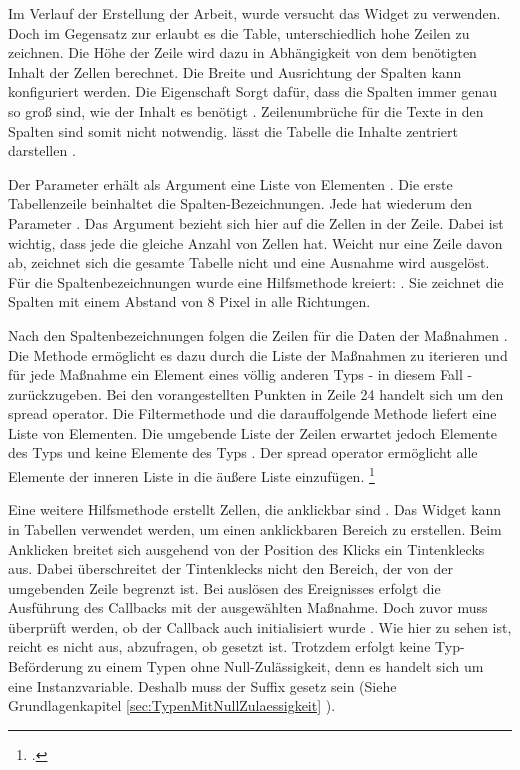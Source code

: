 Im Verlauf der Erstellung der Arbeit, wurde versucht das Widget  zu verwenden.
Doch im Gegensatz zur  erlaubt es die Table, unterschiedlich hohe Zeilen zu zeichnen.
Die Höhe der Zeile wird dazu in Abhängigkeit von dem benötigten Inhalt der Zellen berechnet.
Die Breite und Ausrichtung der Spalten kann konfiguriert werden.
Die Eigenschaft  Sorgt dafür, dass die Spalten immer genau so groß sind, wie der Inhalt es benötigt .  Zeilenumbrüche für die Texte in den Spalten sind somit nicht notwendig. lässt die  Tabelle die Inhalte zentriert darstellen .

Der Parameter  erhält als Argument eine Liste von  Elementen .
Die erste Tabellenzeile  beinhaltet die Spalten-Bezeichnungen.
Jede  hat wiederum den Parameter .
Das Argument bezieht sich hier auf die Zellen in der Zeile.
Dabei ist wichtig, dass jede  die gleiche Anzahl von Zellen hat.
Weicht nur eine Zeile davon ab, zeichnet sich die gesamte Tabelle nicht und eine Ausnahme wird ausgelöst.
Für die Spaltenbezeichnungen wurde eine Hilfsmethode kreiert:  .
Sie zeichnet die Spalten mit einem Abstand von 8 Pixel in alle Richtungen.

Nach den Spaltenbezeichnungen folgen die Zeilen für die Daten der Maßnahmen .
Die Methode   ermöglicht es dazu durch die Liste der Maßnahmen zu iterieren und für jede Maßnahme ein Element eines völlig anderen Typs - in diesem Fall  - zurückzugeben.
Bei den vorangestellten Punkten  in Zeile 24 handelt sich um den spread operator. Die Filtermethode  und die darauffolgende Methode  liefert eine Liste von  Elementen. Die umgebende Liste der Zeilen   erwartet jedoch Elemente des Typs  und keine Elemente des Typs . Der spread operator ermöglicht alle Elemente der inneren Liste in die äußere Liste einzufügen. \footcite[Vgl.][]{SpreadOperator}

Eine weitere Hilfsmethode  erstellt Zellen, die anklickbar sind .
Das Widget   kann in Tabellen verwendet werden, um einen anklickbaren Bereich zu erstellen.
Beim  Anklicken breitet sich ausgehend von der Position des Klicks ein Tintenklecks  aus.
Dabei überschreitet der Tintenklecks nicht den Bereich, der von der umgebenden Zeile begrenzt ist.
Bei auslösen des Ereignisses  erfolgt die Ausführung des Callbacks   mit der ausgewählten Maßnahme.
Doch zuvor muss überprüft werden, ob der Callback auch initialisiert wurde .
Wie hier zu sehen ist, reicht es nicht aus, abzufragen, ob   gesetzt ist.
Trotzdem erfolgt keine Typ-Beförderung zu einem Typen ohne Null-Zulässigkeit, denn es handelt sich um eine Instanzvariable.
Deshalb muss der Suffix \IC{!} gesetz sein (Siehe Grundlagenkapitel \ref{sec:TypenMitNullZulaessigkeit} ).

